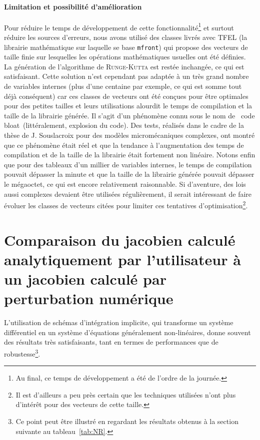 \documentclass[12pt]{article}
\newcommand{\mfront}{\texttt{mfront}}
\begin{document}
\paragraph{Limitation et possibilité d'amélioration} Pour réduire le
temps de développement de cette fonctionnalité\footnote{Au final, ce
  temps de développement a été de l'ordre de la journée.} et surtout
réduire les sources d'erreurs, nous avons utilisé des classes livrés
avec TFEL (la librairie mathématique sur laquelle se base \mfront{}) qui
propose des vecteurs de taille finie sur lesquelles les opérations
mathématiques usuelles ont été définies. La génération de l'algorithme
de \textsc{Runge-Kutta} est restée inchangée, ce qui est satisfaisant.
Cette solution n'est cependant pas adaptée à un très grand nombre de
variables internes (plus d'une centaine par exemple, ce qui est somme
tout déjà conséquent) car ces classes de vecteurs ont été conçues pour
être optimales pour des petites tailles et leurs utilisations alourdit
le temps de compilation et la taille de la librairie générée. Il s'agit
d'un phénomène connu sous le nom de \og~code bloat~\fg (littéralement,
explosion du code). Des tests, réalisés dans le cadre de la thèse de J.
Souslacroix pour des modèles micromécaniques complexes, ont montré que
ce phénomène était réel et que la tendance à l'augmentation des temps de
compilation et de la taille de la librairie était fortement non
linéaire. Notons enfin que pour des tableaux d'un millier de variables
internes, le temps de compilation pouvait dépasser la minute et que la
taille de la librairie générée pouvait dépasser le mégaoctet, ce qui est
encore relativement raisonnable. Si d'aventure, des lois aussi complexes
devaient être utilisées régulièrement, il serait intéressant de faire
évoluer les classes de vecteurs citées pour limiter ces tentatives
d'optimisation\footnote{Il est d'ailleurs a peu près certain que les
  techniques utilisées n'ont plus d'intérêt pour des vecteurs de cette
  taille.}.

\clearpage
\newpage
\section{Comparaison du jacobien calculé analytiquement par
  l'utilisateur à un jacobien calculé par perturbation numérique}
\label{JacobienNumerique}

L'utilisation de schémas d'intégration implicite, qui transforme un
système différentiel en un système d'équations généralement
non-linéaires, donne souvent des résultats très satisfaisants, tant en
termes de performances que de robustesse\footnote{Ce point peut être
illustré en regardant les résultats obtenus à la section suivante au
tableau~\ref{tab:NR}.}.
\end{document}
